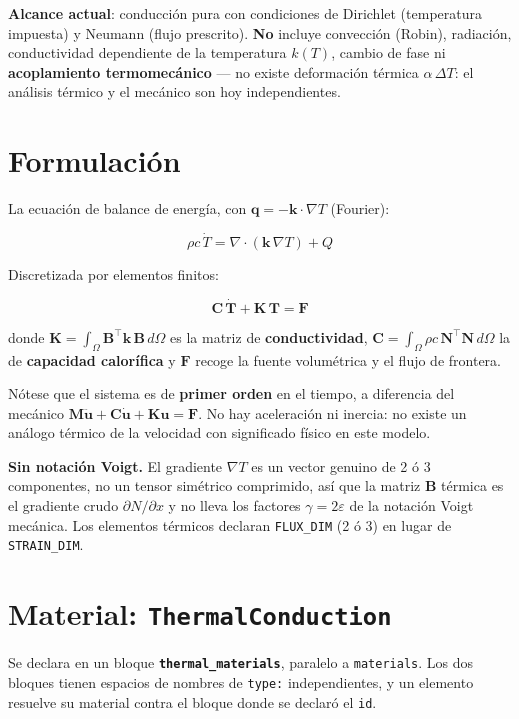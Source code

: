 \documentclass[11pt,oneside]{report}
\begin{document}
\textbf{Alcance actual}: conducción pura con condiciones de Dirichlet (temperatura impuesta) y Neumann (flujo prescrito). \textbf{No} incluye convección (Robin), radiación, conductividad dependiente de la temperatura $k(T)$, cambio de fase ni \textbf{acoplamiento termomecánico} --- no existe deformación térmica $\alpha\,\Delta T$: el análisis térmico y el mecánico son hoy independientes.

\section{Formulación}

La ecuación de balance de energía, con $\mathbf q = -\mathbf k\cdot\nabla T$ (Fourier):

\[
\rho c\,\dot T = \nabla\cdot(\mathbf k\,\nabla T) + Q
\]

Discretizada por elementos finitos:

\[
\mathbf C\,\dot{\mathbf T} + \mathbf K\,\mathbf T = \mathbf F
\]

donde $\mathbf K = \int_\Omega \mathbf B^\top\mathbf k\,\mathbf B\,d\Omega$ es la matriz de \textbf{conductividad}, $\mathbf C = \int_\Omega \rho c\,\mathbf N^\top\mathbf N\,d\Omega$ la de \textbf{capacidad calorífica} y $\mathbf F$ recoge la fuente volumétrica y el flujo de frontera.

Nótese que el sistema es de \textbf{primer orden} en el tiempo, a diferencia del mecánico $\mathbf M\ddot{\mathbf u} + \mathbf C\dot{\mathbf u} + \mathbf K\mathbf u = \mathbf F$. No hay aceleración ni inercia: no existe un análogo térmico de la velocidad con significado físico en este modelo.

\textbf{Sin notación Voigt.} El gradiente $\nabla T$ es un vector genuino de 2 ó 3 componentes, no un tensor simétrico comprimido, así que la matriz $\mathbf B$ térmica es el gradiente crudo $\partial N/\partial x$ y no lleva los factores $\gamma = 2\varepsilon$ de la notación Voigt mecánica. Los elementos térmicos declaran \texttt{FLUX\_DIM} (2 ó 3) en lugar de \texttt{STRAIN\_DIM}.

\section{Material: \texttt{ThermalConduction}}

Se declara en un bloque \textbf{\texttt{thermal\_\allowbreak{}materials}}, paralelo a \texttt{materials}. Los dos bloques tienen espacios de nombres de \texttt{type:} independientes, y un elemento resuelve su material contra el bloque donde se declaró el \texttt{id}.
\end{document}
